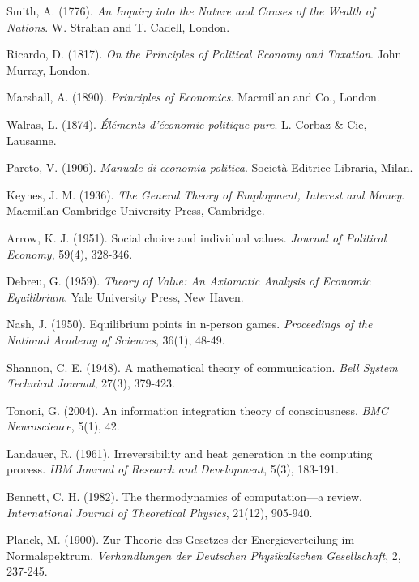 \documentclass[12pt,a4paper]{article}
\begin{document}

\begin{thebibliography}{99}

 Smith, A. (1776). \textit{An Inquiry into the Nature and Causes of the Wealth of Nations}. W. Strahan and T. Cadell, London.

 Ricardo, D. (1817). \textit{On the Principles of Political Economy and Taxation}. John Murray, London.

 Marshall, A. (1890). \textit{Principles of Economics}. Macmillan and Co., London.

 Walras, L. (1874). \textit{Éléments d'économie politique pure}. L. Corbaz \& Cie, Lausanne.

 Pareto, V. (1906). \textit{Manuale di economia politica}. Società Editrice Libraria, Milan.

 Keynes, J. M. (1936). \textit{The General Theory of Employment, Interest and Money}. Macmillan Cambridge University Press, Cambridge.

 Arrow, K. J. (1951). Social choice and individual values. \textit{Journal of Political Economy}, 59(4), 328-346.

 Debreu, G. (1959). \textit{Theory of Value: An Axiomatic Analysis of Economic Equilibrium}. Yale University Press, New Haven.

 Nash, J. (1950). Equilibrium points in n-person games. \textit{Proceedings of the National Academy of Sciences}, 36(1), 48-49.

 Shannon, C. E. (1948). A mathematical theory of communication. \textit{Bell System Technical Journal}, 27(3), 379-423.

 Tononi, G. (2004). An information integration theory of consciousness. \textit{BMC Neuroscience}, 5(1), 42.

 Landauer, R. (1961). Irreversibility and heat generation in the computing process. \textit{IBM Journal of Research and Development}, 5(3), 183-191.

 Bennett, C. H. (1982). The thermodynamics of computation—a review. \textit{International Journal of Theoretical Physics}, 21(12), 905-940.

 Planck, M. (1900). Zur Theorie des Gesetzes der Energieverteilung im Normalspektrum. \textit{Verhandlungen der Deutschen Physikalischen Gesellschaft}, 2, 237-245.


\end{thebibliography}
\end{document}
